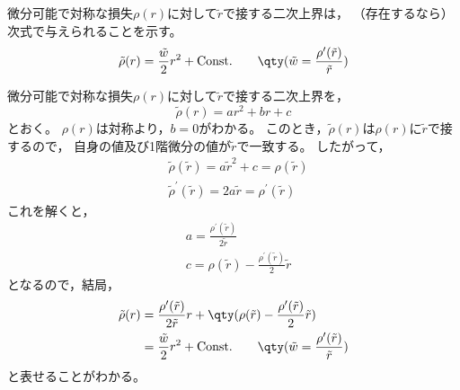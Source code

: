 \documentclass[class=jsarticle, crop=false, dvipdfmx, fleqn]{standalone}
\begin{document}
\section{}

微分可能で対称な損失\(\rho(r)\)に対して\(\tilde{r}\)で接する二次上界は，
（存在するなら）次式で与えられることを示す。
\begin{equation}
    \tilde{\rho}(r) = \frac{\tilde{w}}{2} r^2 + \mathrm{Const.}
    \qquad \qty(\tilde{w} = \frac{\rho^\prime (\tilde{r})}{\tilde{r}})
\end{equation}

微分可能で対称な損失\(\rho(r)\)に対して\(\tilde{r}\)で接する二次上界を，
\begin{equation}
    \tilde{\rho}(r) = ar^2 + br + c
\end{equation}
とおく。
\(\rho(r)\)は対称より，\(b = 0\)がわかる。
このとき，\(\tilde{\rho}(r)\)は\(\rho(r)\)に\(\tilde{r}\)で接するので，
自身の値及び1階微分の値が\(\tilde{r}\)で一致する。
したがって，
\begin{align}
    & \tilde{\rho}(\tilde{r}) = a{\tilde{r}}^2 + c = \rho(\tilde{r}) \\
    & \tilde{\rho}^\prime (\tilde{r}) = 2a\tilde{r} = \rho^\prime (\tilde{r})
\end{align}
これを解くと，
\begin{align}
    & a = \frac{\rho^\prime (\tilde{r})}{2 \tilde{r}} \\
    & c = \rho(\tilde{r}) - \frac{\rho^\prime (\tilde{r})}{2} \tilde{r}
\end{align}
となるので，結局，
\begin{align}
    \tilde{\rho}(r)
        & = \frac{\rho^\prime (\tilde{r})}{2 \tilde{r}} r + \qty(\rho(\tilde{r}) - \frac{\rho^\prime (\tilde{r})}{2} \tilde{r}) \\
        & = \frac{\tilde{w}}{2} r^2 + \mathrm{Const.}
            \qquad \qty(\tilde{w} = \frac{\rho^\prime (\tilde{r})}{\tilde{r}})
\end{align}
と表せることがわかる。
\end{document}

